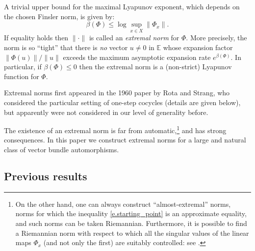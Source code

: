 \documentclass[10pt]{amsart}
\theoremstyle{plain}
\theoremstyle{definition}
\newcommand{\EE}{\mathbb{E}}
\begin{document}
A trivial upper bound for the maximal Lyapunov exponent, which depends on the chosen Finsler norm, is given by:
\begin{equation} \label{e.starting_point}
\beta(\Phi) \le \log \sup_{x \in X} \| \Phi_x \|.
\end{equation}
If equality holds then $\| \mathord{\cdot} \|$ is called an \emph{extremal norm} for $\Phi$.
More precisely, the norm is so ``tight'' that
there is \emph{no} vector $u \neq 0$ in $\EE$ whose expansion factor $\|\Phi(u)\| / \|u\|$ exceeds the maximum asymptotic expansion rate $e^{\beta(\Phi)}$.
In particular, if $\beta(\Phi) \le 0$ then the extremal norm is a (non-strict) Lyapunov function for $\Phi$.

Extremal norms first appeared in the 1960 paper \cite{RS} by Rota and Strang, who considered the particular setting of one-step cocycles (details are given below), but apparently were not considered in our level of generality before.

The existence of an extremal norm is far from automatic,\footnote{On the other hand, one can always construct ``almost-extremal'' norms, \ie norms for which the inequality \eqref{e.starting_point} is an approximate equality, and such norms can be taken Riemannian. Furthermore, it is possible to find a Riemannian norm with respect to which all the singular values of the linear maps $\Phi_x$ (and not only the first) are suitably controlled: see \cite[Prop.\,4.1]{Bochi_ICM}.} and has strong consequences.
In this paper we construct extremal norms for a large and natural
class of vector bundle automorphisms.

\subsection{Previous results}\label{ss.known}
\end{document}
